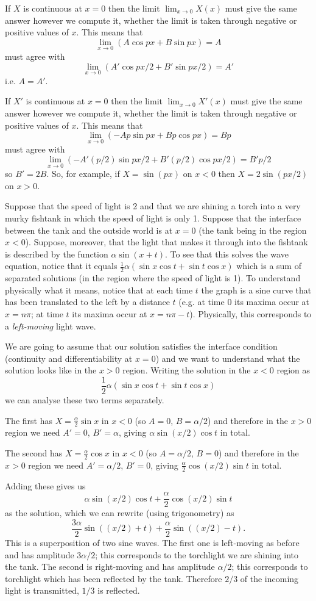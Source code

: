 If $X$ is continuous at $x=0$ then the limit $\lim_{x\to 0}X(x)$ must give the same answer however we compute it, whether the limit is taken through negative or positive values of $x$. This means that
\[\lim_{x\to 0}(A\cos px+B\sin px)=A\]
must agree with
\[\lim_{x\to 0}(A'\cos px/2+B'\sin px/2)=A'\]
i.e. $A=A'$.

If $X'$ is continuous at $x=0$ then the limit $\lim_{x\to 0}X'(x)$ must give the same answer however we compute it, whether the limit is taken through negative or positive values of $x$. This means that
\[\lim_{x\to 0}(-Ap\sin px+Bp\cos px)=Bp\]
must agree with
\[\lim_{x\to 0}(-A'(p/2)\sin px/2+B'(p/2)\cos px/2)=B'p/2\]
so $B'=2B$. So, for example, if $X=\sin(px)$ on $x<0$ then $X=2\sin(px/2)$ on $x>0$.

\begin{exm}
Suppose that the speed of light is 2 and that we are shining a torch into a very murky fishtank in which the speed of light is only 1. Suppose that the interface between the tank and the outside world is at $x=0$ (the tank being in the region $x<0$). Suppose, moreover, that the light that makes it through into the fishtank is described by the function $\alpha\sin(x+t)$. To see that this solves the wave equation, notice that it equals $\frac{1}{2}\alpha\left(\sin x\cos t+\sin t\cos x\right)$ which is a sum of separated solutions (in the region where the speed of light is 1). To understand physically what it means, notice that at each time $t$ the graph is a sine curve that has been translated to the left by a distance $t$ (e.g. at time 0 its maxima occur at $x=n\pi$; at time $t$ its maxima occur at $x=n\pi-t$). Physically, this corresponds to a {\em left-moving} light wave.

We are going to assume that our solution satisfies the interface condition (continuity and differentiability at $x=0$) and we want to understand what the solution looks like in the $x>0$ region. Writing the solution in the $x<0$ region as
\[\frac{1}{2}\alpha\left(\sin x\cos t+\sin t\cos x\right)\]
we can analyse these two terms separately.

The first has $X=\frac{\alpha}{2}\sin x$ in $x<0$ (so $A=0$, $B=\alpha/2$) and therefore in the $x>0$ region we need $A'=0$, $B'=\alpha$, giving $\alpha\sin(x/2)\cos t$ in total.

The second has $X=\frac{\alpha}{2}\cos x$ in $x<0$ (so $A=\alpha/2$, $B=0$) and therefore in the $x>0$ region we need $A'=\alpha/2$, $B'=0$, giving $\frac{\alpha}{2}\cos(x/2)\sin t$ in total.

Adding these gives us
\[\alpha\sin(x/2)\cos t+\frac{\alpha}{2}\cos(x/2)\sin t\]
as the solution, which we can rewrite (using trigonometry) as
\[\frac{3\alpha}{2}\sin((x/2)+t)+\frac{\alpha}{2}\sin((x/2)-t).\]
This is a superposition of two sine waves. The first one is left-moving as before and has amplitude $3\alpha/2$; this corresponds to the torchlight we are shining into the tank. The second is right-moving and has amplitude $\alpha/2$; this corresponds to torchlight which has been reflected by the tank. Therefore $2/3$ of the incoming light is transmitted, $1/3$ is reflected.
\end{exm}


